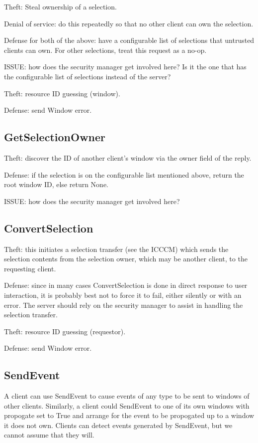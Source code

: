 \documentclass{article}
\begin{document}
Theft: Steal ownership of a selection.

Denial of service: do this repeatedly so that no other client can own
the selection.

Defense for both of the above: have a configurable list of selections
that untrusted clients can own.  For other selections, treat this
request as a no-op.

ISSUE: how does the security manager get involved here?  Is it the one
that has the configurable list of selections instead of the server?

Theft: resource ID guessing (window).

Defense: send Window error.



\subsection{GetSelectionOwner}

Theft: discover the ID of another client's window via the owner field
of the reply.

Defense: if the selection is on the configurable list mentioned above,
return the root window ID, else return None.

ISSUE: how does the security manager get involved here?



\subsection{ConvertSelection}

Theft: this initiates a selection transfer (see the ICCCM) which sends
the selection contents from the selection owner, which may be another
client, to the requesting client.

Defense: since in many cases ConvertSelection is done in direct
response to user interaction, it is probably best not to force it to
fail, either silently or with an error.  The server should rely on the
security manager to assist in handling the selection transfer.

Theft: resource ID guessing (requestor).

Defense: send Window error.



\subsection{SendEvent}

A client can use SendEvent to cause events of any type to be sent to
windows of other clients.  Similarly, a client could SendEvent to one
of its own windows with propogate set to True and arrange for the
event to be propogated up to a window it does not own.  Clients can
detect events generated by SendEvent, but we cannot assume that they
will.
\end{document}
